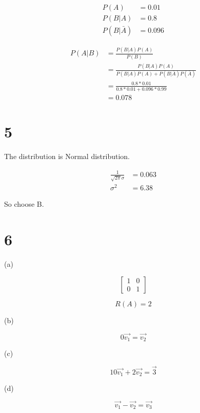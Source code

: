 \documentclass{article}
\begin{document}
\begin{align*}
  P(A) &= 0.01 \\
  P(B | A) &= 0.8 \\
  P(B | \bar{A}) &= 0.096
\end{align*}

\begin{align*}
  P(A | B) &= \frac{P(B|A)P(A)}{P(B)} \\
           &= \frac{P(B|A)P(A)}{P(B|A)P(A) + P(B|\bar{A})P(\bar{A})} \\
           &= \frac{0.8 * 0.01}{0.8 * 0.01 + 0.096 * 0.99} \\
           &= 0.078
\end{align*}

\section*{5}

The distribution is Normal distribution.

\begin{align*}
  \frac{1}{\sqrt{2\pi}\sigma} &= 0.063 \\
  \sigma^{2} &= 6.38
\end{align*}

So choose B.

\section*{6}

(a)

$$
\begin{bmatrix}
1 & 0 \\
0 & 1
\end{bmatrix}
$$

$$
R(A) = 2
$$

(b)

$$
0\vec{v_{1}} = \vec{v_{2}}
$$

(c)

$$
10\vec{v_{1}} + 2\vec{v_{2}} = \vec{3}
$$

(d)

$$
\vec{v_{1}} - \vec{v_{2}} = \vec{v_{3}}
$$
\end{document}
